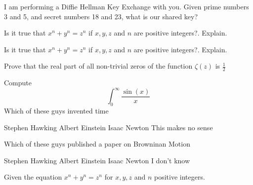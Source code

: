 \documentclass{exam}
\begin{document}
\begin{questions}
  \question[25] I am performing a Diffie Hellman Key Exchange with you. Given prime numbers 3 and 5, and secret numbers 18 and 23, 
  what is our shared key?



  \clearpage

	\question Is it true that \(x^n + y^n = z^n\) if \(x,y,z\) and \(n\) are
	positive integers?. Explain.

	\question Is it true that \(x^n + y^n = z^n\) if \(x,y,z\) and \(n\) are positive integers?. Explain.

	\question Prove that the real part of all non-trivial zeros of the function \(\zeta(z)\) is \(\frac{1}{2}\)
	\clearpage

	\question Compute \[\int_{0}^{\infty} \frac{\sin(x)}{x}\]
	\question Which of these guys invented time

	\begin{oneparchoices}
		\choice Stephen Hawking 
		\choice Albert Einstein
		\choice Isaac Newton
		\choice This makes no sense
	\end{oneparchoices}

	\question Which of these guys published a paper on Browninan Motion

	\begin{checkboxes}
		\choice Stephen Hawking 
		\choice Albert Einstein
		\choice Isaac Newton
		\choice I don't know
	\end{checkboxes} 

	\clearpage

	\question Given the equation \(x^n + y^n = z^n\) for \(x,y,z\) and \(n\) positive
	integers. 
\end{questions}
\end{document}
